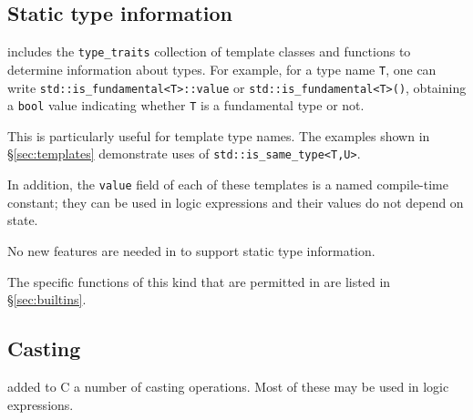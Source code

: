 \subsection{Static type information}

\lang includes the \lstinline|type_traits| collection of template classes and functions to determine information about types.
For example, for a type name \lstinline|T|, one can write
\lstinline|std::is_fundamental<T>::value| or
\lstinline|std::is_fundamental<T>()|, obtaining a 
\lstinline|bool| value indicating whether 
\lstinline|T| is a fundamental type or not.

This is particularly useful for template type names. The examples shown in \S\ref{sec:templates} demonstrate uses of \lstinline|std::is_same_type<T,U>|.

In addition, the \lstinline|value| field of each of these templates is a named \lang compile-time constant; they can be used in logic expressions and their values do not depend on state.

No new features are needed in \NAME to support static type information. 

The specific \lang functions of this kind that are permitted in \NAME are listed in \S\ref{sec:builtins}.

\subsection{Casting}
\label{sec:casts}

\lang added to C a number of casting operations. Most of these may be 
used in logic expressions.


